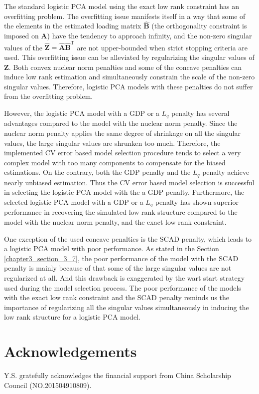 The standard logistic PCA model using the exact low rank constraint has an overfitting problem. The overfitting issue manifests itself in a way that some of the elements in the estimated loading matrix $\hat{\mathbf{B}}$ (the orthogonality constraint is imposed on $\mathbf{A}$) have the tendency to approach infinity, and the non-zero singular values of the $\hat{\mathbf{Z}} = \hat{\mathbf{A}}\hat{\mathbf{B}}^{\text{T}}$ are not upper-bounded when strict stopping criteria are used. This overfitting issue can be alleviated by regularizing the singular values of $\mathbf{Z}$. Both convex nuclear norm penalties and some of the concave penalties can induce low rank estimation and simultaneously constrain the scale of the non-zero singular values. Therefore, logistic PCA models with these penalties do not suffer from the overfitting problem.

However, the logistic PCA model with a GDP or a $L_{q}$ penalty has several advantages compared to the model with the nuclear norm penalty. Since the nuclear norm penalty applies the same degree of shrinkage on all the singular values, the large singular values are shrunken too much. Therefore, the implemented CV error based model selection procedure tends to select a very complex model with too many components to compensate for the biased estimations. On the contrary, both the GDP penalty and the $L_{q}$ penalty achieve nearly unbiased estimation. Thus the CV error based model selection is successful in selecting the logistic PCA model with the a GDP penalty. Furthermore, the selected logistic PCA model with a GDP or a $L_{q}$ penalty has shown superior performance in recovering the simulated low rank structure compared to the model with the nuclear norm penalty, and the exact low rank constraint.

One exception of the used concave penalties is the SCAD penalty, which leads to a logistic PCA model with poor performance. As stated in the Section \ref{chapter3_section_3_7}, the poor performance of the model with the SCAD penalty is mainly because of that some of the large singular values are not regularized at all. And this drawback is exaggerated by the wart start strategy used during the model selection process. The poor performance of the models with the exact low rank constraint and the SCAD penalty reminds us the importance of regularizing all the singular values simultaneously in inducing the low rank structure for a logistic PCA model.

\section*{Acknowledgements}
Y.S. gratefully acknowledges the financial support from China Scholarship Council (NO.201504910809).

